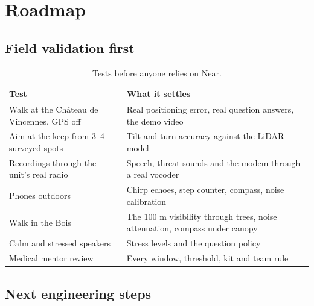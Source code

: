 \chapter{Roadmap}\label{ch:roadmap}

\section{Field validation first}

\begin{table}[htbp]\centering\small
\caption{Tests before anyone relies on Near.}\label{tab:fieldtests}
\begin{tabularx}{\linewidth}{>{\raggedright}p{4.2cm}X}
\toprule
Test & What it settles\\
\midrule
Walk at the Château de Vincennes, GPS off & Real positioning error, real question answers, the demo video\\
Aim at the keep from 3--4 surveyed spots & Tilt and turn accuracy against the LiDAR model\\
Recordings through the unit's real radio & Speech, threat sounds and the modem through a real vocoder\\
Phones outdoors & Chirp echoes, step counter, compass, noise calibration\\
Walk in the Bois & The 100 m visibility through trees, noise attenuation, compass under canopy\\
Calm and stressed speakers & Stress levels and the question policy\\
Medical mentor review & Every window, threshold, kit and team rule\\
\bottomrule
\end{tabularx}
\end{table}

\section{Next engineering steps}


